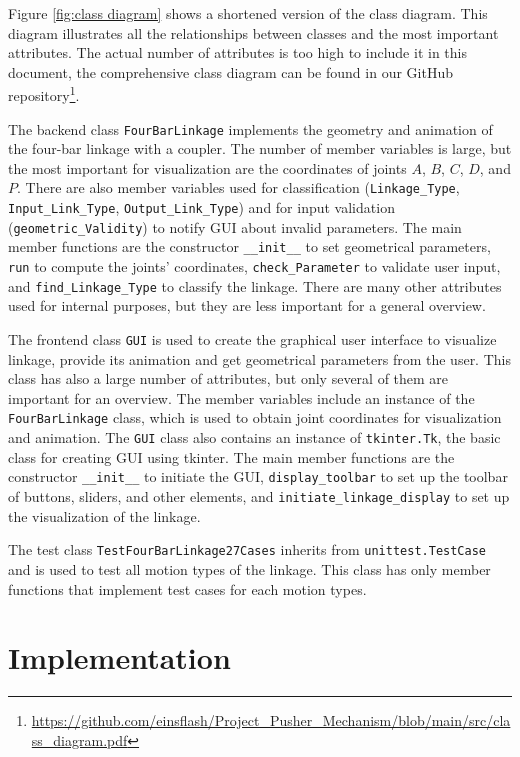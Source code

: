 \documentclass{article}
\begin{document}
Figure \ref{fig:class diagram} shows a shortened version of the class diagram. This diagram illustrates all the relationships between classes and the most important attributes. The actual number of attributes is too high to include it in this document, the comprehensive class diagram can be found in our GitHub repository\footnote{\url{https://github.com/einsflash/Project_Pusher_Mechanism/blob/main/src/class_diagram.pdf}}.

The backend class \texttt{FourBarLinkage} implements the geometry and animation of the four-bar linkage with a coupler. The number of member variables is large, but the most important for visualization are the coordinates of joints $A$, $B$, $C$, $D$, and $P$. There are also member variables used for classification (\texttt{Linkage\_Type}, \texttt{Input\_Link\_Type}, \texttt{Output\_Link\_Type}) and for input validation (\texttt{geometric\_Validity}) to notify GUI about invalid parameters. The main member functions are the constructor \texttt{\_\_init\_\_} to set geometrical parameters, \texttt{run} to compute the joints' coordinates, \texttt{check\_Parameter} to validate user input, and \texttt{find\_Linkage\_Type} to classify the linkage. There are many other attributes used for internal purposes, but they are less important for a general overview.

The frontend class \texttt{GUI} is used to create the graphical user interface to visualize linkage, provide its animation and get geometrical parameters from the user. This class has also a large number of attributes, but only several of them are important for an overview. The member variables include an instance of the \texttt{FourBarLinkage} class, which is used to obtain joint coordinates for visualization and animation. The \texttt{GUI} class also contains an instance of \texttt{tkinter.Tk}, the basic class for creating GUI using tkinter. The main member functions are the constructor \texttt{\_\_init\_\_} to initiate the GUI, \texttt{display\_toolbar} to set up the toolbar of buttons, sliders, and other elements, and \texttt{initiate\_linkage\_display} to set up the visualization of the linkage.

The test class \texttt{TestFourBarLinkage27Cases} inherits from \texttt{unittest.TestCase} and is used to test all motion types of the linkage. This class has only member functions that implement test cases for each motion types.

\section{Implementation} \label{ch:implementation}
\end{document}
